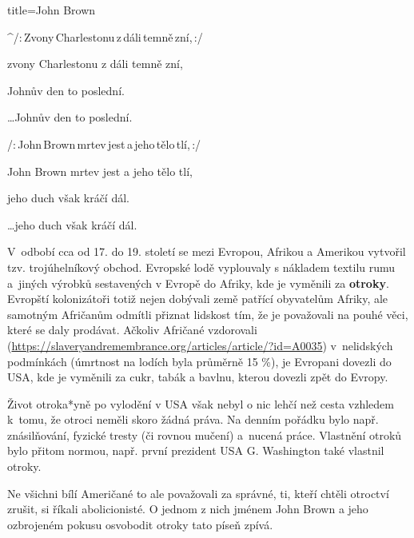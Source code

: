 \begin{song}{title=\predtitle \centering John Brown \\\large  }
{\begin{centerjustified}
\begin{varwidth}[t]{0.55\textwidth}
\sloka
^{}/:\,Zvony\,Charlestonu\,z\,dáli\,temně\,zní,\,:/

zvony Charlestonu z dáli temně zní,

Johnův den to poslední.

\dots  Johnův den to poslední.

\sloka
/:\,John\,Brown\,mrtev\,jest\,a\,jeho\,tělo\,tlí,\,:/

John Brown mrtev jest a jeho tělo tlí,

jeho duch však kráčí dál.

\dots  jeho duch však kráčí dál.

\end{varwidth}
\end{centerjustified}

\hrulefill

V~odbobí cca od 17. do 19. století se mezi Evropou, Afrikou a Amerikou vytvořil
tzv. trojúhelníkový obchod. Evropské lodě vyplouvaly s nákladem textilu rumu a~jiných
výrobků sestavených v Evropě do Afriky, kde je vyměnili za \textbf{otroky}.
Evropští kolonizátoři totiž nejen dobývali země patřící obyvatelům Afriky, ale samotným Afričanům
odmítli přiznat lidskost tím, že je považovali na pouhé věci, které se daly prodávat.
Ačkoliv Afričané vzdorovali (\url{https://slaveryandremembrance.org/articles/article/?id=A0035})
v~nelidských podmínkách (úmrtnost na lodích byla průměrně 15 \%), je Evropani dovezli do
USA, kde je vyměnili za cukr, tabák a bavlnu, kterou dovezli zpět do Evropy.

Život otroka*yně po vylodění v USA však nebyl o nic lehčí než cesta vzhledem
k~tomu, že otroci neměli skoro žádná práva. Na denním pořádku bylo např.
znásilňování, fyzické tresty (či rovnou mučení) a~nucená práce. Vlastnění
otroků bylo přitom normou, např. první prezident USA G. Washington také vlastnil
otroky.

Ne všichni bílí Američané to ale považovali za správné, ti, kteří chtěli
otroctví zrušit, si říkali abolicionisté. O jednom z nich jménem John Brown
a jeho ozbrojeném pokusu osvobodit otroky tato píseň zpívá.

}




\setcounter{Slokočet}{0}
\end{song}

